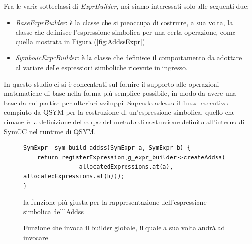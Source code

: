 \documentclass[Lau, oneside]{sapthesis}%
\begin{document}
\newline \newline
Fra le varie sottoclassi di \textit{ExprBuilder}, noi siamo interessati solo alle seguenti due:
\begin{itemize}
    \item \textit{BaseExprBuilder}: è la classe che si preoccupa di costruire, a sua volta, la classe che definisce l'espressione simbolica per una certa operazione, come quella mostrata in Figura (\ref{fig:AddssExpr})
    \item \textit{SymbolicExprBuilder}: è la classe che definisce il comportamento da adottare al variare delle espressioni simboliche ricevute in ingresso.
\end{itemize}





\newpage
In questo studio ci si è concentrati sul fornire il supporto alle operazioni matematiche di base nella forma più semplice possibile, in modo da avere una base da cui partire per ulteriori sviluppi.
\newline \newline
Sapendo adesso il flusso esecutivo compiuto da QSYM per la costruzione di un'espressione simbolica, quello che rimane è la definizione del corpo del metodo di costruzione definito all'interno di SymCC nel runtime di QSYM.
\begin{figure}[h]
\begin{lstlisting}[xleftmargin=0\textwidth, language=SymQEMU, basicstyle=\small]
SymExpr _sym_build_addss(SymExpr a, SymExpr b) { 
    return registerExpression(g_expr_builder->createAddss( 
                allocatedExpressions.at(a), allocatedExpressions.at(b))); 
}
\end{lstlisting}
    \caption{Funzione che invoca il builder globale, il quale a sua volta andrà ad invocare}{la funzione più giusta per la rappresentazione dell'espressione simbolica dell'Addss}
    \label{fig:costruzione_addss}
\end{figure}







\newpage
\end{document}
